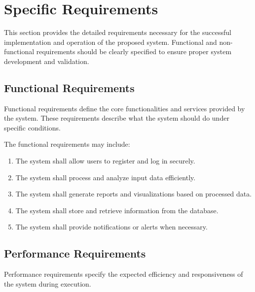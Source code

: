 
\section{Specific Requirements}

This section provides the detailed requirements necessary for the successful implementation and operation of the proposed system. Functional and non-functional requirements should be clearly specified to ensure proper system development and validation.


\subsection{Functional Requirements}

Functional requirements define the core functionalities and services provided by the system. These requirements describe what the system should do under specific conditions.

The functional requirements may include:
\begin{enumerate}
    \item The system shall allow users to register and log in securely.
    
    \item The system shall process and analyze input data efficiently.
    
    \item The system shall generate reports and visualizations based on processed data.
    
    \item The system shall store and retrieve information from the database.
    
    \item The system shall provide notifications or alerts when necessary.
\end{enumerate}


\subsection{Performance Requirements}

Performance requirements specify the expected efficiency and responsiveness of the system during execution.

